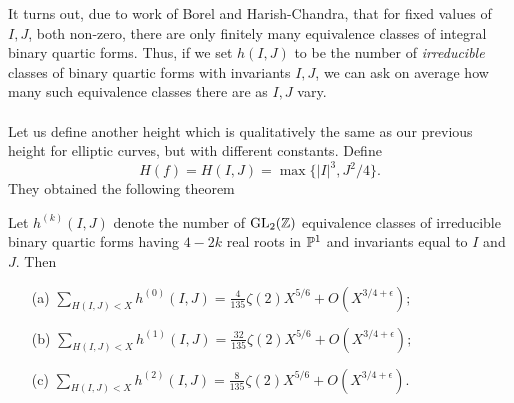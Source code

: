 \documentclass[12pt,amsfont]{amsart}
\begin{document}
It turns out, due to work of Borel and Harish-Chandra, that for fixed values of $I,J$, both non-zero, there are only finitely many equivalence classes of integral binary quartic forms. Thus, if we set $h(I,J)$ to be the number of \emph{irreducible} classes of binary quartic forms with invariants $I,J$, we can ask on average how many such equivalence classes there are as $I,J$ vary. \\ \\
Let us define another height which is qualitatively the same as our previous height for elliptic curves, but with different constants. Define 
\[H(f) = H(I,J) = \max\{|I|^3, J^2/4\}.\] 
They obtained the following theorem
\begin{theorem} Let $h^{(k)}(I,J)$ denote the number of $\operatorname{GL}_2({\mathbb Z})$ equivalence classes of irreducible binary quartic forms having $4 - 2k$ real roots in $\mathbb{P}^1$ and invariants equal to $I$ and $J$. Then
\begin{itemize}
\item[(a)] $\displaystyle \sum_{H(I,J) < X} h^{(0)}(I,J) = \frac{4}{135} \zeta(2) X^{5/6} + O(X^{3/4 + \epsilon});$
\item[(b)] $\displaystyle \sum_{H(I,J) < X} h^{(1)}(I,J) = \frac{32}{135} \zeta(2) X^{5/6} + O(X^{3/4 + \epsilon}); $
\item[(c)] $\displaystyle \sum_{H(I,J) < X} h^{(2)}(I,J) = \frac{8}{135} \zeta(2) X^{5/6} + O(X^{3/4 + \epsilon}).$
\end{itemize}
\end{theorem}
\end{document}
